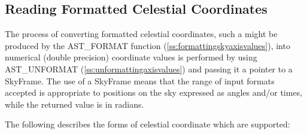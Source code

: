 \documentclass[twoside,11pt]{article}
\newcommand{\htmlref}[2]{#1}
\newcommand{\secref}[1]{\S\ref{#1}}
\renewcommand{\secref}[1]{\ref{#1}}
\begin{document}
\subsection{\label{ss:unformattingskyaxisvalues}Reading Formatted Celestial Coordinates}

The process of converting formatted celestial coordinates, such a
might be produced by the \htmlref{AST\_FORMAT}{AST_FORMAT} function
(\secref{ss:formattingskyaxisvalues}), into numerical (double
precision) coordinate values is performed by using \htmlref{AST\_UNFORMAT}{AST_UNFORMAT}
(\secref{ss:unformattingaxisvalues}) and passing it a pointer to a
\htmlref{SkyFrame}{SkyFrame}. The use of a SkyFrame means that the range of input formats
accepted is appropriate to positions on the sky expressed as angles
and/or times, while the returned value is in radians.

The following describes the forms of celestial coordinate which are
supported:
\end{document}

